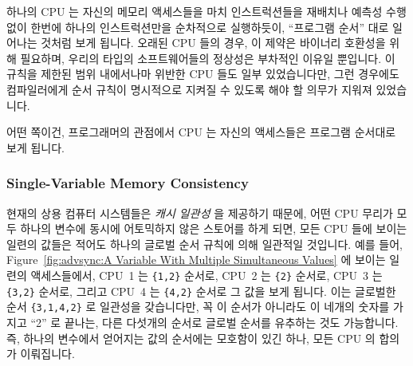 하나의 CPU 는 자신의 메모리 액세스들을 마치 인스트럭션들을 재배치나 예측성 수행
없이 한번에 하나의 인스트럭션만을 순차적으로 실행하듯이, ``프로그램 순서'' 대로
일어나는 것처럼 보게 됩니다.
오래된 CPU 들의 경우, 이 제약은 바이너리 호환성을 위해 필요하며, 우리의 타입의
소프트웨어들의 정상성은 부차적인 이유일 뿐입니다.
이 규칙을 제한된 범위 내에서나마 위반한 CPU 들도 일부 있었습니다만, 그런
경우에도 컴파일러에게 순서 규칙이 명시적으로 지켜질 수 있도록 해야 할 의무가
지워져 있었습니다.

어떤 쪽이건, 프로그래머의 관점에서 CPU 는 자신의 액세스들은 프로그램 순서대로
보게 됩니다.

\subsubsection{Single-Variable Memory Consistency}
\label{sec:advsync:Single-Variable Memory Consistency}

현재의 상용 컴퓨터 시스템들은 \emph{캐시 일관성} 을 제공하기 때문에, 어떤 CPU
무리가 모두 하나의 변수에 동시에 어토믹하지 않은 스토어를 하게 되면, 모든 CPU
들에 보이는 일련의 값들은 적어도 하나의 글로벌 순서 규칙에 의해 일관적일
것입니다.
예를 들어,
Figure~\ref{fig:advsync:A Variable With Multiple Simultaneous Values} 에 보이는
일련의 액세스들에서,
CPU~1 는 {\tt \{1,2\}} 순서로,
CPU~2 는 {\tt \{2\}} 순서로,
CPU~3 는 {\tt \{3,2\}} 순서로,
그리고
CPU~4 는 {\tt \{4,2\}} 순서로 그 값을 보게 됩니다.
이는 글로벌한 순서 {\tt \{3,1,4,2\}} 로 일관성을 갖습니다만, 꼭 이 순서가
아니라도 이 네개의 숫자를 가지고 ``2'' 로 끝나는, 다른 다섯개의 순서로 글로벌
순서를 유추하는 것도 가능합니다.
즉, 하나의 변수에서 얻어지는 값의 순서에는 모호함이 있긴 하나, 모든 CPU 의
합의가 이뤄집니다.

